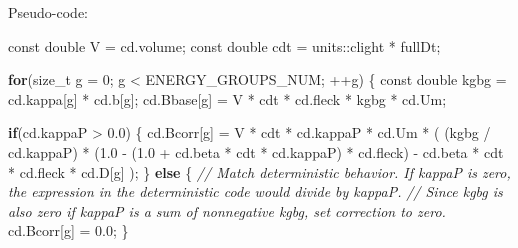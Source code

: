 \documentclass[
]{article}
\newenvironment{Shaded}{}{}
\newcommand{\AttributeTok}[1]{\textcolor[rgb]{0.49,0.56,0.16}{#1}}
\newcommand{\CommentTok}[1]{\textcolor[rgb]{0.38,0.63,0.69}{\textit{#1}}}
\newcommand{\ControlFlowTok}[1]{\textcolor[rgb]{0.00,0.44,0.13}{\textbf{#1}}}
\newcommand{\DataTypeTok}[1]{\textcolor[rgb]{0.56,0.13,0.00}{#1}}
\newcommand{\DecValTok}[1]{\textcolor[rgb]{0.25,0.63,0.44}{#1}}
\newcommand{\FloatTok}[1]{\textcolor[rgb]{0.25,0.63,0.44}{#1}}
\newcommand{\NormalTok}[1]{#1}
\newcommand{\OperatorTok}[1]{\textcolor[rgb]{0.40,0.40,0.40}{#1}}
\begin{document}
Pseudo-code:

\begin{Shaded}
\begin{Highlighting}[]
\AttributeTok{const} \DataTypeTok{double}\NormalTok{ V }\OperatorTok{=}\NormalTok{ cd}\OperatorTok{.}\NormalTok{volume}\OperatorTok{;}
\AttributeTok{const} \DataTypeTok{double}\NormalTok{ cdt }\OperatorTok{=}\NormalTok{ units}\OperatorTok{::}\NormalTok{clight }\OperatorTok{*}\NormalTok{ fullDt}\OperatorTok{;}

\ControlFlowTok{for}\OperatorTok{(}\DataTypeTok{size\_t}\NormalTok{ g }\OperatorTok{=} \DecValTok{0}\OperatorTok{;}\NormalTok{ g }\OperatorTok{\textless{}}\NormalTok{ ENERGY\_GROUPS\_NUM}\OperatorTok{;} \OperatorTok{++}\NormalTok{g}\OperatorTok{)}
\OperatorTok{\{}
    \AttributeTok{const} \DataTypeTok{double}\NormalTok{ kgbg }\OperatorTok{=}\NormalTok{ cd}\OperatorTok{.}\NormalTok{kappa}\OperatorTok{[}\NormalTok{g}\OperatorTok{]} \OperatorTok{*}\NormalTok{ cd}\OperatorTok{.}\NormalTok{b}\OperatorTok{[}\NormalTok{g}\OperatorTok{];}
\NormalTok{    cd}\OperatorTok{.}\NormalTok{Bbase}\OperatorTok{[}\NormalTok{g}\OperatorTok{]} \OperatorTok{=}\NormalTok{ V }\OperatorTok{*}\NormalTok{ cdt }\OperatorTok{*}\NormalTok{ cd}\OperatorTok{.}\NormalTok{fleck }\OperatorTok{*}\NormalTok{ kgbg }\OperatorTok{*}\NormalTok{ cd}\OperatorTok{.}\NormalTok{Um}\OperatorTok{;}

    \ControlFlowTok{if}\OperatorTok{(}\NormalTok{cd}\OperatorTok{.}\NormalTok{kappaP }\OperatorTok{\textgreater{}} \FloatTok{0.0}\OperatorTok{)}
    \OperatorTok{\{}
\NormalTok{        cd}\OperatorTok{.}\NormalTok{Bcorr}\OperatorTok{[}\NormalTok{g}\OperatorTok{]} \OperatorTok{=}\NormalTok{ V }\OperatorTok{*}\NormalTok{ cdt }\OperatorTok{*}\NormalTok{ cd}\OperatorTok{.}\NormalTok{kappaP }\OperatorTok{*}\NormalTok{ cd}\OperatorTok{.}\NormalTok{Um }\OperatorTok{*}
            \OperatorTok{(}
                \OperatorTok{(}\NormalTok{kgbg }\OperatorTok{/}\NormalTok{ cd}\OperatorTok{.}\NormalTok{kappaP}\OperatorTok{)} \OperatorTok{*} \OperatorTok{(}\FloatTok{1.0} \OperatorTok{{-}} \OperatorTok{(}\FloatTok{1.0} \OperatorTok{+}\NormalTok{ cd}\OperatorTok{.}\NormalTok{beta }\OperatorTok{*}\NormalTok{ cdt }\OperatorTok{*}\NormalTok{ cd}\OperatorTok{.}\NormalTok{kappaP}\OperatorTok{)} \OperatorTok{*}\NormalTok{ cd}\OperatorTok{.}\NormalTok{fleck}\OperatorTok{)}
                \OperatorTok{{-}}\NormalTok{ cd}\OperatorTok{.}\NormalTok{beta }\OperatorTok{*}\NormalTok{ cdt }\OperatorTok{*}\NormalTok{ cd}\OperatorTok{.}\NormalTok{fleck }\OperatorTok{*}\NormalTok{ cd}\OperatorTok{.}\NormalTok{D}\OperatorTok{[}\NormalTok{g}\OperatorTok{]}
            \OperatorTok{);}
    \OperatorTok{\}}
    \ControlFlowTok{else}
    \OperatorTok{\{}
        \CommentTok{// Match deterministic behavior. If kappaP is zero, the expression in the deterministic code would divide by kappaP.}
        \CommentTok{// Since kgbg is also zero if kappaP is a sum of nonnegative kgbg, set correction to zero.}
\NormalTok{        cd}\OperatorTok{.}\NormalTok{Bcorr}\OperatorTok{[}\NormalTok{g}\OperatorTok{]} \OperatorTok{=} \FloatTok{0.0}\OperatorTok{;}
    \OperatorTok{\}}


\end{Highlighting}
\end{Shaded}
\end{document}
